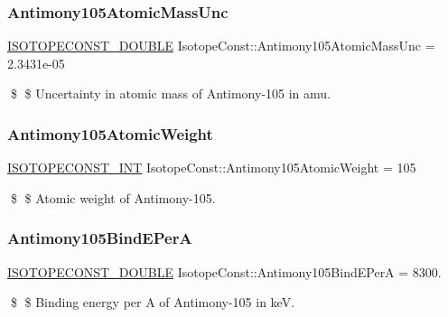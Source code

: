\subsubsection{\texorpdfstring{Antimony105\+Atomic\+Mass\+Unc}{Antimony105AtomicMassUnc}}
{\footnotesize\ttfamily \mbox{\hyperlink{group___isotope_const-_macros_ga8f45a7272ce02c0b4c65c44636ed719a}{I\+S\+O\+T\+O\+P\+E\+C\+O\+N\+S\+T\+\_\+\+D\+O\+U\+B\+LE}} Isotope\+Const\+::\+Antimony105\+Atomic\+Mass\+Unc = 2.\+3431e-\/05}

\$ \$ Uncertainty in atomic mass of Antimony-\/105 in amu. \mbox{\label{group___isotope_const-_antimony-_sb105_ga968d8c6a366fcb9331c3c4e255ae3148}} 
\subsubsection{\texorpdfstring{Antimony105\+Atomic\+Weight}{Antimony105AtomicWeight}}
{\footnotesize\ttfamily \mbox{\hyperlink{group___isotope_const-_macros_ga5f18360b3e99483a35c32d789e62621c}{I\+S\+O\+T\+O\+P\+E\+C\+O\+N\+S\+T\+\_\+\+I\+NT}} Isotope\+Const\+::\+Antimony105\+Atomic\+Weight = 105}

\$ \$ Atomic weight of Antimony-\/105. \mbox{\label{group___isotope_const-_antimony-_sb105_ga239a599f5ea55bc9f29931b0e95e4281}} 
\subsubsection{\texorpdfstring{Antimony105\+Bind\+E\+PerA}{Antimony105BindEPerA}}
{\footnotesize\ttfamily \mbox{\hyperlink{group___isotope_const-_macros_ga8f45a7272ce02c0b4c65c44636ed719a}{I\+S\+O\+T\+O\+P\+E\+C\+O\+N\+S\+T\+\_\+\+D\+O\+U\+B\+LE}} Isotope\+Const\+::\+Antimony105\+Bind\+E\+PerA = 8300.}

\$ \$ Binding energy per A of Antimony-\/105 in keV. \mbox{\label{group___isotope_const-_antimony-_sb105_ga85b6bd821c5a6703209eb86f24490894}} 
